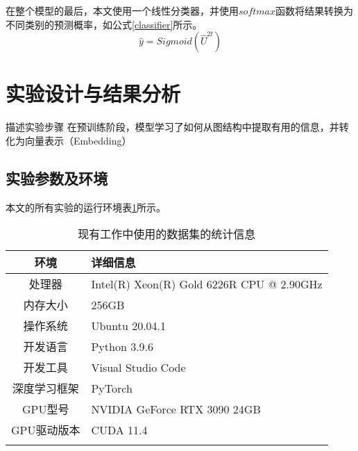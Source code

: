 在整个模型的最后，本文使用一个线性分类器，并使用$softmax$函数将结果转换为不同类别的预测概率，如公式\eqref{classifier}所示。
\begin{equation}
\hat{y}=Sigmoid(\hat{U}^{2t}) \label{classifier}
\end{equation}
\section{实验设计与结果分析}
\label{sec:实验设计与结果分析}
描述实验步骤
在预训练阶段，模型学习了如何从图结构中提取有用的信息，并转化为向量表示（Embedding）


\subsection{实验参数及环境}
\label{sec:实验参数及环境}
本文的所有实验的运行环境表\ref{tab:environment}所示。

\begin{table}[htbp]
    \caption{\label{tab:environment}现有工作中使用的数据集的统计信息}
    \small
    \renewcommand{\arraystretch}{1.5}
    \begin{tabularx}{\linewidth}{cX<{\centering}}
        \Xhline{2\arrayrulewidth}
        环境      & 详细信息                                      \\ \hline
        处理器     & Intel(R) Xeon(R) Gold 6226R CPU @ 2.90GHz \\
        内存大小    & 256GB                                     \\
        操作系统    & Ubuntu 20.04.1                            \\
        开发语言    & Python 3.9.6                              \\
        开发工具    & Visual Studio Code                        \\
        深度学习框架  & PyTorch                                   \\
        GPU型号   & NVIDIA GeForce RTX 3090 24GB              \\
        GPU驱动版本 & CUDA 11.4                                 \\ 
        \Xhline{2\arrayrulewidth}
        \end{tabularx}
\end{table}

